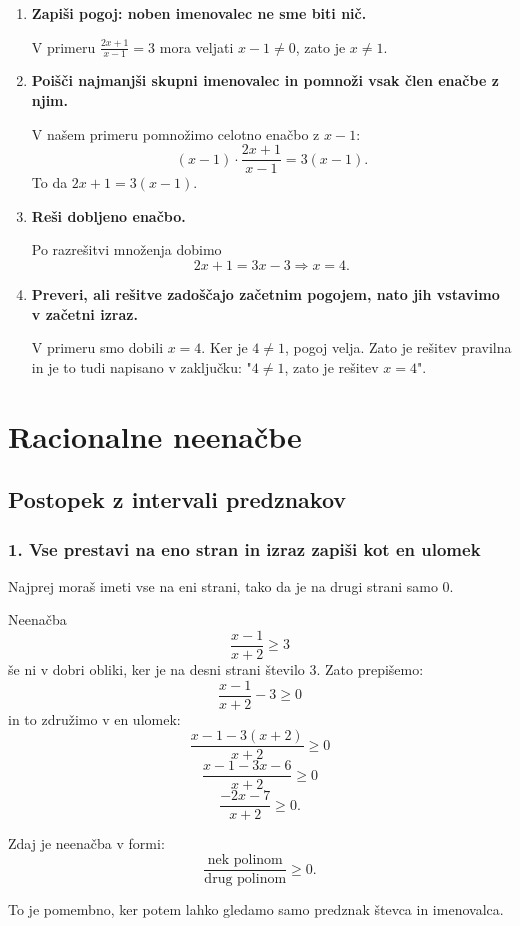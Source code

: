 \documentclass[11pt]{article}
\begin{document}
\begin{enumerate}[leftmargin=*]
  \item \textbf{Zapiši pogoj: noben imenovalec ne sme biti nič.}
    \begin{primerbox}
      V primeru $\frac{2x+1}{x-1}=3$ mora veljati $x-1\ne 0$, zato je $x\ne 1$.
    \end{primerbox}

  \item \textbf{Poišči najmanjši skupni imenovalec in pomnoži vsak člen enačbe z njim.}
    \begin{primerbox}
      V našem primeru pomnožimo celotno enačbo z $x-1$:
      \[
      (x-1)\cdot \frac{2x+1}{x-1} = 3(x-1).
      \]
      To da $2x+1=3(x-1)$.
    \end{primerbox}

  \item \textbf{Reši dobljeno enačbo.}
    \begin{primerbox}
      Po razrešitvi množenja dobimo
      \[
      2x+1=3x-3 \Rightarrow x=4.
      \]
    \end{primerbox}

  \item \textbf{Preveri, ali rešitve zadoščajo začetnim pogojem, nato jih vstavimo v začetni izraz.}
    \begin{primerbox}
      V primeru smo dobili $x=4$. Ker je $4\ne 1$, pogoj velja. Zato je rešitev pravilna in je to tudi napisano v zaključku: "$4\ne 1$, zato je rešitev $x=4$".
    \end{primerbox}
\end{enumerate}


\section{Racionalne neenačbe}

\subsection{Postopek z intervali predznakov}

\subsubsection*{1. Vse prestavi na eno stran in izraz zapiši kot en ulomek}
Najprej moraš imeti vse na eni strani, tako da je na drugi strani samo 0.

\begin{primerbox}
Neenačba
\[
\frac{x-1}{x+2}\ge 3
\]
še ni v dobri obliki, ker je na desni strani število 3. Zato prepišemo:
\[
\frac{x-1}{x+2}-3\ge 0
\]
in to združimo v en ulomek:
\[
\frac{x-1-3(x+2)}{x+2}\ge 0
\]
\[
\frac{x-1-3x-6}{x+2}\ge 0
\]
\[
\frac{-2x-7}{x+2}\ge 0.
\]

Zdaj je neenačba v formi:
\[
\frac{\text{nek polinom}}{\text{drug polinom}} \ge 0.
\]

To je pomembno, ker potem lahko gledamo samo predznak števca in imenovalca.
\end{primerbox}
\end{document}
